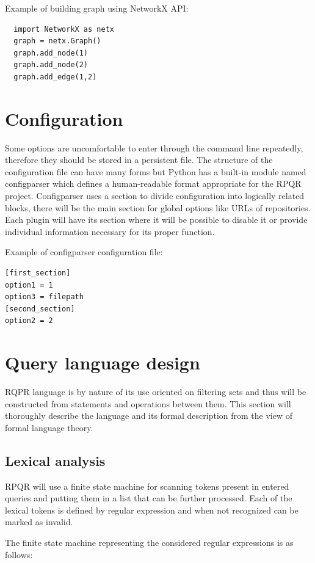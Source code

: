 Example of building graph using NetworkX API:
\begin{lstlisting}
  import NetworkX as netx
  graph = netx.Graph()
  graph.add_node(1)
  graph.add_node(2)
  graph.add_edge(1,2)
\end{lstlisting}

\section*{Configuration}
Some options are uncomfortable to enter through the command line repeatedly, therefore they should
be stored in a persistent file. The structure of the configuration file can have many forms but Python has
a built-in module named configparser\cite{configparser} which defines a human-readable format appropriate for the RPQR project.
Configparser uses a section to divide configuration into logically related blocks, there will be
the main section for global options like URLs of repositories. Each plugin will have its section
where it will be possible to disable it or provide individual information necessary for its proper
function.

Example of configparser configuration file:
\begin{lstlisting}
[first_section]
option1 = 1
option3 = filepath
[second_section]
option2 = 2
\end{lstlisting}

\newpage

\section{Query language design}
RQPR language is by nature of its use oriented on filtering sets and thus will be constructed from
statements and operations between them. This section will thoroughly describe the language and
its formal description from the view of formal language theory.

\subsection*{Lexical analysis}
RPQR will use a finite state machine for scanning tokens present in entered queries and putting them
in a list that can be further processed. Each of the lexical tokens is defined by regular expression
and when not recognized can be marked as invalid.

The finite state machine representing the considered regular expressions is as follows:

